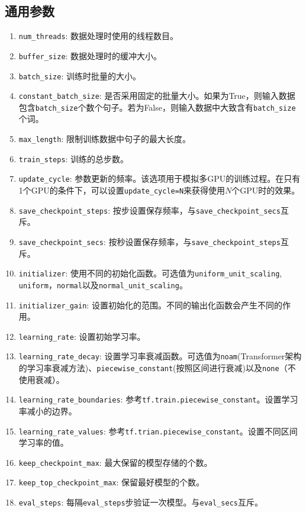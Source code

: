 \documentclass{article}
\begin{document}
\subsection{通用参数}
\begin{enumerate}
\item \verb|num_threads|: 数据处理时使用的线程数目。
\item \verb|buffer_size|: 数据处理时的缓冲大小。
\item \verb|batch_size|: 训练时批量的大小。
\item \verb|constant_batch_size|: 是否采用固定的批量大小。如果为True，则输入数据包含\verb|batch_size|个数个句子。若为False，则输入数据中大致含有\verb|batch_size|个词。
\item \verb|max_length|: 限制训练数据中句子的最大长度。
\item \verb|train_steps|: 训练的总步数。
\item \verb|update_cycle|: 参数更新的频率。该选项用于模拟多GPU的训练过程。在只有1个GPU的条件下，可以设置\verb|update_cycle=N|来获得使用$N$个GPU时的效果。
\item \verb|save_checkpoint_steps|: 按步设置保存频率，与\verb|save_checkpoint_secs|互斥。
\item \verb|save_checkpoint_secs|: 按秒设置保存频率，与\verb|save_checkpoint_steps|互斥。
\item \verb|initializer|: 使用不同的初始化函数。可选值为\verb|uniform_unit_scaling|,\\ \verb|uniform|，\verb|normal|以及\verb|normal_unit_scaling|。
\item \verb|initializer_gain|: 设置初始化的范围。不同的输出化函数会产生不同的作用。
\item \verb|learning_rate|: 设置初始学习率。
\item \verb|learning_rate_decay|: 设置学习率衰减函数。可选值为\verb|noam|(Transformer架构的学习率衰减方法)、\verb|piecewise_constant|(按照区间进行衰减)以及\verb|none|（不使用衰减）。
\item \verb|learning_rate_boundaries|: 参考\verb|tf.train.piecewise_constant|。设置学习率减小的边界。
\item \verb|learning_rate_values|: 参考\verb|tf.trian.piecewise_constant|。设置不同区间学习率的值。
\item \verb|keep_checkpoint_max|: 最大保留的模型存储的个数。
\item \verb|keep_top_checkpoint_max|: 保留最好模型的个数。
\item \verb|eval_steps|: 每隔\verb|eval_steps|步验证一次模型。与\verb|eval_secs|互斥。

\end{enumerate}
\end{document}
